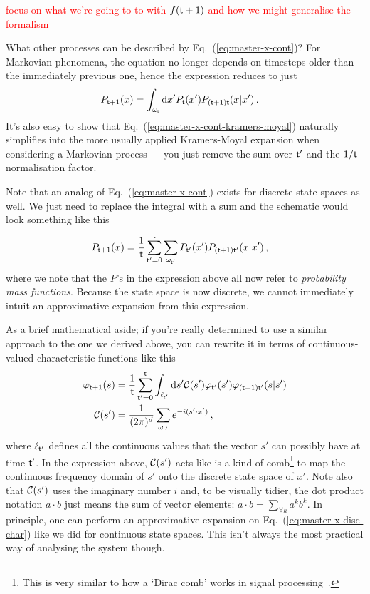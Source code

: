 \textcolor{red}{focus on what we're going to to with $f({\sf t}+1)$ and how we might generalise the formalism}

What other processes can be described by Eq.~(\ref{eq:master-x-cont})? For Markovian phenomena, the equation no longer depends on timesteps older than the immediately previous one, hence the expression reduces to just
\begin{align}
P_{{\sf t}+1}(x) &= \int_{\omega_{\sf t}}{\rm d}x' P_{\sf t}(x') P_{({\sf t}+1){\sf t}}(x\vert x') \label{eq:master-x-cont-markov} \,.
\end{align}
It's also easy to show that Eq.~(\ref{eq:master-x-cont-kramers-moyal}) naturally simplifies into the more usually applied Kramers-Moyal expansion when considering a Markovian process --- you just remove the sum over ${\sf t}'$ and the $1/{\sf t}$ normalisation factor. 

Note that an analog of Eq.~(\ref{eq:master-x-cont}) exists for discrete state spaces as well. We just need to replace the integral with a sum and the schematic would look something like this
\begin{align}
P_{{\sf t}+1}(x) &= \frac{1}{{\sf t}}\sum_{{\sf t}'=0}^{\sf t}\sum_{\omega_{{\sf t}'}} P_{{\sf t}'}(x') P_{({\sf t}+1){\sf t}'}(x \vert x') \label{eq:master-x-disc} \,,
\end{align}
where we note that the $P$'s in the expression above all now refer to \emph{probability mass functions}. Because the state space is now discrete, we cannot immediately intuit an approximative expansion from this expression. 

As a brief mathematical aside; if you're really determined to use a similar approach to the one we derived above, you can rewrite it in terms of continuous-valued characteristic functions like this
\begin{align}
\varphi_{{\sf t}+1}(s) &= \frac{1}{{\sf t}}\sum_{{\sf t}'=0}^{\sf t}\int_{\ell_{{\sf t}'}}{\rm d}s' {\cal C}(s') \varphi_{{\sf t}'}(s') \varphi_{({\sf t}+1){\sf t}'}(s \vert s') \label{eq:master-x-disc-char} \\
{\cal C}(s') &= \frac{1}{(2\pi )^d}\sum_{\omega_{{\sf t}'}}e^{-i(s'\cdot x')} \,,
\end{align}
where $\ell_{{\sf t}'}$ defines all the continuous values that the vector $s'$ can possibly have at time ${\sf t}'$. In the expression above, ${\cal C}(s')$ acts like is a kind of comb\footnote{This is very similar to how a `Dirac comb' works in signal processing~\cite{brandwood2012fourier}.} to map the continuous frequency domain of $s'$ onto the discrete state space of $x'$. Note also that ${\cal C}(s')$ uses the imaginary number $i$ and, to be visually tidier, the dot product notation $a\cdot b$ just means the sum of vector elements: $a\cdot b = \sum_{\forall k}a^kb^k$. In principle, one can perform an approximative expansion on Eq.~(\ref{eq:master-x-disc-char}) like we did for continuous state spaces. This isn't always the most practical way of analysing the system though. 

